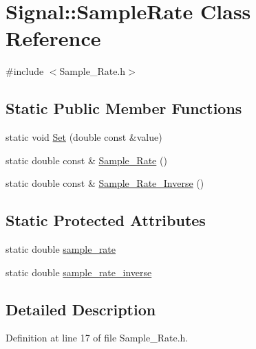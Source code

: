 \hypertarget{classSignal_1_1SampleRate}{\section{Signal\+:\+:Sample\+Rate Class Reference}
\label{classSignal_1_1SampleRate}
}


{\ttfamily \#include $<$Sample\+\_\+\+Rate.\+h$>$}

\subsection*{Static Public Member Functions}
\begin{DoxyCompactItemize}
\item 
static void \hyperlink{classSignal_1_1SampleRate_a4ccc472f12332b06a70cb10818cce76e}{Set} (double const \&value)
\item 
static double const \& \hyperlink{classSignal_1_1SampleRate_a317c7690ee6b64adf45eeeaa29cef83d}{Sample\+\_\+\+Rate} ()
\item 
static double const \& \hyperlink{classSignal_1_1SampleRate_a0ece63ab817d91a1390df4147672768f}{Sample\+\_\+\+Rate\+\_\+\+Inverse} ()
\end{DoxyCompactItemize}
\subsection*{Static Protected Attributes}
\begin{DoxyCompactItemize}
\item 
static double \hyperlink{classSignal_1_1SampleRate_a47170c125b6d2436c2818237362c0df2}{sample\+\_\+rate}
\item 
static double \hyperlink{classSignal_1_1SampleRate_a970e812aa9bcfe7a7f04a98df0b659bc}{sample\+\_\+rate\+\_\+inverse}
\end{DoxyCompactItemize}


\subsection{Detailed Description}


Definition at line 17 of file Sample\+\_\+\+Rate.\+h.



